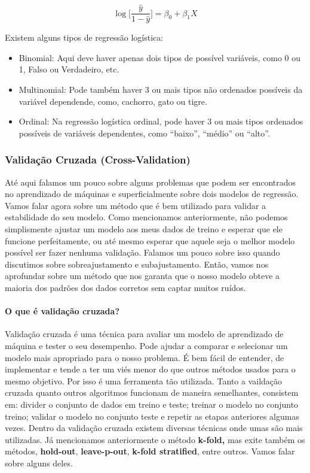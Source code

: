 \documentclass[
  letterpaper,
  DIV=11,
  numbers=noendperiod]{scrreprt}
\let\oldparagraph\paragraph
\renewcommand{\paragraph}[1]{\oldparagraph{#1}\mbox{}}
\begin{document}
\[
\log\bigg[\frac{\hat y}{1- \hat y} \bigg ] = {\beta_0+\beta_1X}
\]

Existem alguns tipos de regressão logística:

\begin{itemize}
\item
  Binomial: Aqui deve haver apenas dois tipos de possível variáveis,
  como 0 ou 1, Falso ou Verdadeiro, etc.
\item
  Multinomial: Pode também haver 3 ou mais tipos não ordenados possíveis
  da variável dependende, como, cachorro, gato ou tigre.
\item
  Ordinal: Na regressão logística ordinal, pode haver 3 ou mais tipos
  ordenados possíveis de variáveis \hspace{0pt}\hspace{0pt}dependentes,
  como ``baixo'', ``médio'' ou ``alto''.
\end{itemize}

\hypertarget{validauxe7uxe3o-cruzada-cross-validation}{%
\subsubsection{Validação Cruzada
(Cross-Validation)}\label{validauxe7uxe3o-cruzada-cross-validation}}

Até aqui falamos um pouco sobre alguns problemas que podem ser
encontrados no aprendizado de máquinas e superficialmente sobre dois
modelos de regressão. Vamos falar agora sobre um método que é bem
utilizado para validar a estabilidade do seu modelo. Como mencionamos
anteriormente, não podemos simplismente ajustar um modelo aos meus dados
de treino e esperar que ele funcione perfeitamente, ou até mesmo esperar
que aquele seja o melhor modelo possível ser fazer nenhuma validação.
Falamos um pouco sobre isso quando discutimos sobre sobreajustamento e
subajustamento. Então, vamos nos aprofundar sobre um método que nos
garanta que o nosso modelo obteve a maioria dos padrões dos dados
corretos sem captar muitos ruídos.

\hypertarget{o-que-uxe9-validauxe7uxe3o-cruzada}{%
\paragraph{O que é validação
cruzada?}\label{o-que-uxe9-validauxe7uxe3o-cruzada}}

Validação cruzada é uma técnica para avaliar um modelo de aprendizado de
máquina e tester o seu desempenho. Pode ajudar a comparar e selecionar
um modelo mais apropriado para o nosso problema. É bem fácil de
entender, de implementar e tende a ter um viés menor do que outros
métodos usados para o mesmo objetivo. Por isso é uma ferramenta tão
utilizada. Tanto a vaildação cruzada quanto outros algoritmos funcionam
de maneira semelhantes, consistem em: divider o conjunto de dados em
treino e teste; treinar o modelo no conjunto treino; validar o modelo no
conjunto teste e repetir as etapas anteriores algumas vezes. Dentro da
validação cruzada existem diversas técnicas onde umas são mais
utilizadas. Já mencionamos anteriormente o método \textbf{k-fold,} mas
exite também os métodos, \textbf{hold-out}, \textbf{leave-p-out},
\textbf{k-fold stratified}, entre outros. Vamos falar sobre alguns
deles.
\end{document}

